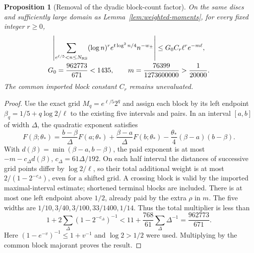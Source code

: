 \documentclass[11pt]{article}
\numberwithin{equation}{section}
\newtheorem{proposition}[theorem]{Proposition}
\theoremstyle{definition}
\theoremstyle{remark}
\begin{document}
\begin{proposition}[Removal of the dyadic block-count factor]
\label{upd:convex-dyadic}
On the same discs and sufficiently large domain as
Lemma~\ref{lem:weighted-moments}, for every fixed integer $r\ge0$,
\begin{equation}
 \begin{gathered}
 \left|\sum_{e^{\ell/5}<n\le N_{\rm RS}}(\log n)^r
                e^{t\log^2n/4}n^{-w_\pm}\right|
 \le G_0C_r\ell^r e^{-m\ell},\\
 G_0=\frac{962773}{671}<1435,\qquad
 m=\frac{76399}{1273600000}>\frac1{20000}.
 \end{gathered}
 \label{upd:convex-remainder}
\end{equation}
The common imported block constant $C_r$ remains unevaluated.
\end{proposition}
\begin{proof}
Use the exact grid $M_q=e^{\ell/5}2^q$ and assign each block by its
left endpoint $\beta_q=1/5+q\log2/\ell$ to the existing five
intervals and pairs.  In an interval $[a,b]$ of width $\Delta$,
the quadratic exponent satisfies
\[
 F(\beta;\theta_*)=\frac{b-\beta}{\Delta}F(a;\theta_*)
 +\frac{\beta-a}{\Delta}F(b;\theta_*)
 -\frac{\theta_*}{4}(\beta-a)(b-\beta).
\]
With $d(\beta)=\min(\beta-a,b-\beta)$, the paid exponent is at most
$-m-c_\Delta d(\beta)$, $c_\Delta=61\Delta/192$.
On each half interval the distances of successive grid points differ
by $\log2/\ell$, so their total additional weight is at most
$2/(1-2^{-c_\Delta})$, even for a shifted grid.  A crossing block
is valid by the imported maximal-interval estimate; shortened terminal
blocks are included. There is at most one left endpoint above $1/2$,
already paid by the extra $\rho$ in $m$. The five widths are
$1/10,3/40,3/100,33/1400,1/14$. Thus the total multiplier is less than
\[
 1+2\sum_\Delta(1-2^{-c_\Delta})^{-1}
 <11+\frac{768}{61}\sum_\Delta\Delta^{-1}
                         =\frac{962773}{671}.
\]
Here $(1-e^{-v})^{-1}\le1+v^{-1}$ and $\log2>1/2$ were used.
Multiplying by the common block majorant proves the result.
\end{proof}
\end{document}
